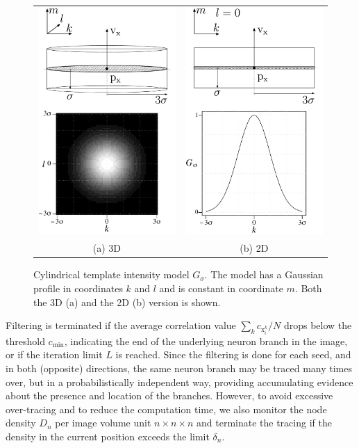 \begin{figure}
	\centering
	\begin{tabular}{cc}
		\includegraphics[width=0.3\columnwidth]{fig3a} &
		\includegraphics[width=0.3\columnwidth]{fig3b} \\
		(a) 3D  & (b)  2D
	\end{tabular}
	\caption{Cylindrical template intensity model $G_{\sigma}$. The model has a Gaussian profile in coordinates $k$ and $l$ and is constant in coordinate $m$. Both the 3D (a) and the 2D (b) version is shown.}
	\label{fig3}
\end{figure}

Filtering is terminated if the average correlation value $\sum_{k} c_{\mathrm{x}_i^k}/N$ drops below the threshold $c_{\text{min}}$, indicating the end of the underlying neuron branch in the image, or if the iteration limit $L$ is reached. Since the filtering is done for each seed, and in both (opposite) directions, the same neuron branch may be traced many times over, but in a probabilistically independent way, providing accumulating evidence about the presence and location of the branches. However, to avoid excessive over-tracing and to reduce the computation time, we also monitor the node density $D_n$ per image volume unit $n \times n \times n$ and terminate the tracing if the density in the current position exceeds the limit $\delta_n$.

